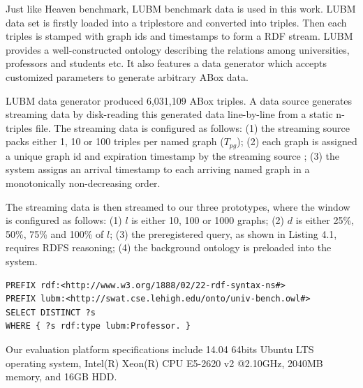 Just like Heaven benchmark, LUBM benchmark\cite{guo2005lubm} data is used in this work. 
LUBM data set is firstly loaded into a triplestore and converted into triples. 
Then each triples is stamped with graph ids and timestamps to form a RDF stream.
LUBM provides a well-constructed ontology describing the relations among universities, professors and students etc.
It also features a data generator which accepts customized parameters to generate arbitrary ABox data.

LUBM data generator produced 6,031,109 ABox triples. 
A data source generates streaming data by disk-reading this generated data line-by-line from a static n-triples file.
The streaming data is configured  as follows:
(1) the streaming source packs either 1, 10 or 100 triples per named graph ($T_{pg}$);
(2) each graph is assigned a unique graph id and expiration timestamp by the streaming source \cite{jp2015stream};
(3) the system assigns an arrival timestamp to each arriving named graph in a monotonically non-decreasing order.

The streaming data is then streamed to our three prototypes, where the window is configured as follows:
(1) $l$ is either 10, 100 or 1000 graphs;
(2) $d$ is either 25\%, 50\%, 75\% and 100\% of $l$;
(3) the preregistered query, as shown in Listing 4.1, requires RDFS reasoning;
(4) the background ontology is preloaded into the system.

\begin{lstlisting}[caption=\textbf{SPARQL Query},basicstyle=\small,frame=single]
PREFIX rdf:<http://www.w3.org/1888/02/22-rdf-syntax-ns#>
PREFIX lubm:<http://swat.cse.lehigh.edu/onto/univ-bench.owl#>
SELECT DISTINCT ?s
WHERE { ?s rdf:type lubm:Professor. }
\end{lstlisting}

Our evaluation platform specifications include 14.04 64bits Ubuntu LTS operating system, Intel(R) Xeon(R) CPU E5-2620 v2 @2.10GHz, 2040MB memory, and 16GB HDD. 


